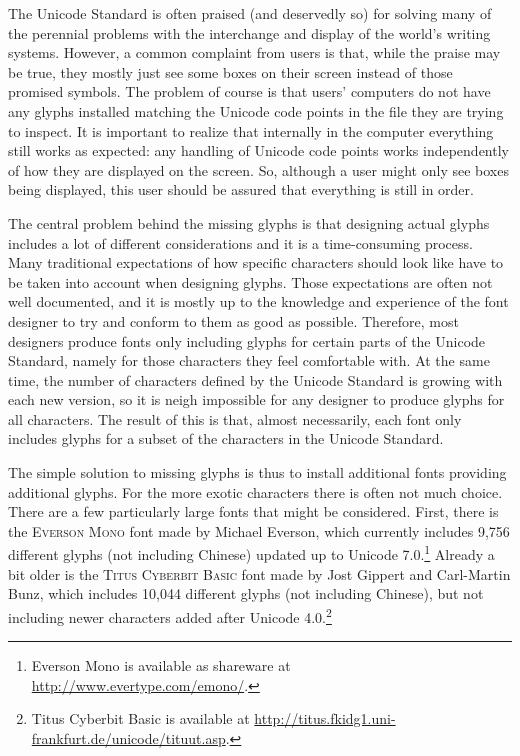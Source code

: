The Unicode Standard is often praised (and deservedly so) for solving many of the perennial problems with the interchange and display of the world's writing systems. However, a common complaint from users is that, while the praise may be true, they mostly just see some boxes on their screen instead of those promised symbols. The problem of course is that users' computers do not have any glyphs installed matching the Unicode code points in the file they are trying to inspect. It is important to realize that internally in the computer everything still works as expected: any handling of Unicode code points works independently of how they are displayed on the screen. So, although a user might only see boxes being displayed, this user should be assured that everything is still in order.

The central problem behind the missing glyphs is that designing actual glyphs includes a lot of different considerations and it is a time-consuming process. Many traditional expectations of how specific characters should look like have to be taken into account when designing glyphs. Those expectations are often not well documented, and it is mostly up to the knowledge and experience of the font designer to try and conform to them as good as possible. Therefore, most designers produce fonts only including glyphs for certain parts of the Unicode Standard, namely for those characters they feel comfortable with. At the same time, the number of characters defined by the Unicode Standard is growing with each new version, so it is neigh impossible for any designer to produce glyphs for all characters. The result of this is that, almost necessarily, each font only includes glyphs for a subset of the characters in the Unicode Standard.

The simple solution to missing glyphs is thus to install additional fonts providing additional glyphs. For the more exotic characters there is often not much choice. There are a few particularly large fonts that might be considered. First, there is the \textsc{Everson Mono} font made by Michael Everson, which currently includes 9,756 different glyphs (not including Chinese) updated up to Unicode 7.0.\footnote{Everson Mono is available as shareware at \url{http://www.evertype.com/emono/}.} Already a bit older is the \textsc{Titus Cyberbit Basic} font made by Jost Gippert and Carl-Martin Bunz, which includes 10,044 different glyphs (not including Chinese), but not including newer characters added after Unicode 4.0.\footnote{Titus Cyberbit Basic is available at \url{http://titus.fkidg1.uni-frankfurt.de/unicode/tituut.asp}.}

